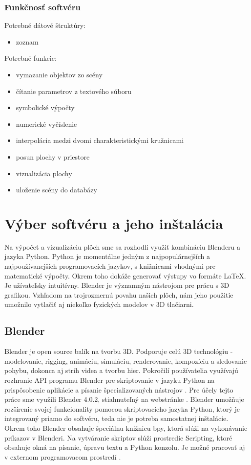 \subsubsection{Funkčnosť softvéru} 
Potrebné dátové štruktúry:
\begin{itemize}
	\item zoznam
\end{itemize}
Potrebné funkcie:
\begin{itemize}
	\item vymazanie objektov zo scény 
    \item čítanie parametrov z textového súboru
    \item symbolické výpočty
    \item numerické vyčíslenie
    \item interpolácia medzi dvomi charakteristickými kružnicami
    \item posun plochy v priestore
    \item vizualizácia plochy
    \item uloženie scény do databázy
\end{itemize}
\section{Výber softvéru a jeho inštalácia}
Na výpočet a vizualizáciu plôch sme sa rozhodli využiť kombináciu Blenderu a jazyka Python. Python je momentálne jedným z najpopulárnejších a najpoužívanejších programovacích jazykov, s knižnicami vhodnými pre matematické výpočty. Okrem toho dokáže generovať výstupy vo formáte \LaTeX. Je užívateľsky intuitívny. Blender je významným nástrojom pre prácu s 3D grafikou. Vzhľadom na trojrozmernú povahu našich plôch, nám jeho použitie umožnilo vytlačiť aj niekoľko fyzických modelov v 3D tlačiarni.
\subsection{Blender}
Blender je open source balík na tvorbu 3D. Podporuje celú 3D technológiu - modelovanie, rigging, animáciu, simuláciu, renderovanie, kompozíciu a sledovanie pohybu, dokonca aj strih videa a tvorbu hier. Pokročilí používatelia využívajú rozhranie API programu Blender pre skriptovanie v jazyku Python na prispôsobenie aplikácie a písanie špecializovaných nástrojov \cite{Blender}. Pre účely tejto práce sme využili Blender 4.0.2, stiahnuteľný na webstránke \cite{BlenderDownload}. Blender umožňuje rozšírenie svojej funkcionality pomocou skriptovacieho jazyka Python, ktorý je integrovaný priamo do softvéru, teda nie je potreba samostatnej inštalácie. Okrem toho Blender obsahuje špeciálnu knižnicu bpy, ktorá slúži na vykonávanie príkazov v Blenderi. Na vytváranie skriptov slúži prostredie Scripting, ktoré obsahuje okná na písanie, úpravu textu a Python konzolu. Je možné pracovať aj v externom programovacom prostredí \cite{BlenderAPI}.

